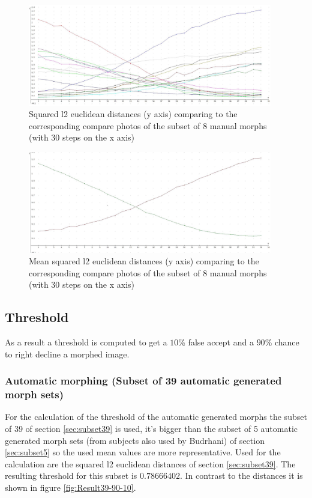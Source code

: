 \begin{figure}[htbp] 
	\centering
		\includegraphics[width=0.95\textwidth]{Resources/result-jannis.jpg}
	\caption{Squared l2 euclidean distances (y axis) comparing to the corresponding compare photos of the subset of 8 manual morphs (with 30 steps on the x axis)}
	\label{fig:result-jannis-all}
\end{figure}
\begin{figure}[htbp] 
	\centering
		\includegraphics[width=0.95\textwidth]{Resources/result-jannis-mean}
	\caption{Mean squared l2 euclidean distances (y axis) comparing to the corresponding compare photos of the subset of 8 manual morphs (with 30 steps on the x axis)}
	\label{fig:result-jannis-mean}
\end{figure}

\newpage
\subsection{Threshold}
As a result a threshold is computed to get a $10$\% false accept and a $90$\% chance to right decline a morphed image.

\subsubsection{Automatic morphing (Subset of 39 automatic generated morph sets)}\label{sec:automorph-thres}
For the calculation of the threshold of the automatic generated morphs the subset of 39 of section \ref{sec:subset39} is used, it's bigger than the subset of 5 automatic generated morph sets (from subjects also used by Budrhani) of section \ref{sec:subset5} so the used mean values are more representative.
Used for the calculation are the squared l2 euclidean distances of section \ref{sec:subset39}.
The resulting threshold for this subset is \textbf{$0.78666402$}. In contrast to the distances it is shown in figure \ref{fig:Result39-90-10}.


